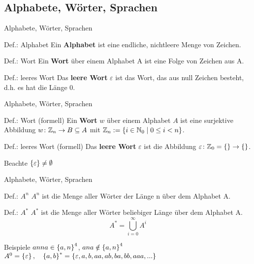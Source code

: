 \subsection{Alphabete, Wörter, Sprachen}
\begin{frame}{Alphabete, Wörter, Sprachen}
	\begin{block}{Def.: Alphabet}
		Ein \textbf{Alphabet} ist eine endliche, nichtleere Menge von Zeichen.
	\end{block}
	\pause
	\begin{block}{Def.: Wort}
		Ein \textbf{Wort} über einem Alphabet A ist eine Folge von Zeichen aus A.
	\end{block}
	\pause
	\begin{block}{Def.: leeres Wort}
		Das \textbf{leere Wort} \(\varepsilon\) ist das Wort, das aus null Zeichen besteht, d.h. es hat die Länge 0.
	\end{block}
\end{frame}

\begin{frame}{Alphabete, Wörter, Sprachen}
	\begin{block}{Def.: Wort (formell)}
		Ein \textbf{Wort} $w$ über einem Alphabet $A$ ist eine surjektive Abbildung $w \colon \mathbb{Z}_n \to B \subseteq A$ mit $\mathbb{Z}_n := \left\{ i \in \mathbb{N}_0 \mid 0 \le i < n \right\}$.
	\end{block}

	\begin{block}{Def.: leeres Wort (formell)}
		Das \textbf{leere Wort} $\varepsilon$ ist die Abbildung $\varepsilon \colon \mathbb{Z}_0 = \left\{  \right\} \to \left\{  \right\}$.	
	\end{block}

	\begin{alertblock}{Beachte}
		$\left\{ \varepsilon \right\} \neq \emptyset$	
	\end{alertblock}

\end{frame}

\begin{frame}{Alphabete, Wörter, Sprachen}
	\begin{block}{Def.: \(A^{n}\)}
		\textbf{\(A^{n}\)} ist die Menge aller Wörter der Länge n über dem Alphabet A.
	\end{block}
	\pause
	\begin{block}{Def.: \(A^{*}\)}
		\textbf{\(A^{*}\)} ist die Menge aller Wörter beliebiger Länge über dem Alphabet A.		
		\[
			A^{*}= \bigcup_{i=0}^{\infty} A^{i}
		\]
	\end{block}
	\pause
	\begin{exampleblock}{Beispiele}
		$anna \in \left\{ a,n \right\}^{4}$, \quad $ana \notin \left\{ a,n \right\}^{4}$
		\(A^{0}=\left\{ \varepsilon \right\}, \quad \left\{ a,b \right\}^{*} = \left\{ \varepsilon, a, b, aa, ab, ba, bb, aaa, ... \right\}\)
	\end{exampleblock}
\end{frame}

